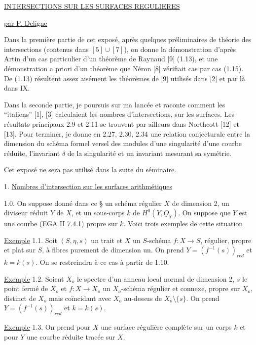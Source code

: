 


\underline{INTERSECTIONS SUR LES SURFACES REGULIERES}


\underline{par P. Deligne}

Dans la première partie de cet exposé, après quelques préliminaires de théorie des intersections (contenus dans $[5] \cup [7]$), on donne la démonstration d'après Artin d'un cas particulier d'un théorème de Raynaud [9] (1.13), et une démonstration a priori d'un théorème que Néron [8] vérifiait cas par cas (1.15). De (1.13) résultent assez aisément les théorèmes de [9] utilisés dans [2] et par là dans IX.

Dans la seconde partie, je poursuis sur ma lancée et raconte comment les ``italiens'' [1], [3] calculaient les nombres d'intersections, sur les surfaces. Les résultats principaux 2.9 et 2.11 se trouvent par ailleurs dans Northcott [12] et [13]. Pour terminer, je donne en 2.27, 2.30, 2.34 une relation conjecturale entre la dimension du schéma formel versel des modules d'une singularité d'une courbe réduite, l'invariant $\delta$ de la singularité et un invariant mesurant sa symétrie.

Cet exposé ne sera pas utilisé dans la suite du séminaire.


1. \underline{Nombres d'intersection sur les surfaces arithmétiques}

1.0. On suppose donné dans ce \S{} un schéma régulier $X$ de dimension 2, un diviseur réduit $Y$ de $X$, et un sous-corps $k$ de $H^0(Y,\underline{O}_Y)$. On suppose que $Y$ est une courbe (EGA II 7.4.1) propre sur $k$. Voici trois exemples de cette situation

\underline{Exemple} 1.1. Soit $(S,\eta,s)$ un trait et $X$ un $S$-schéma $f : X \longrightarrow S$, régulier, propre et plat sur $S$, à fibres purement de dimension un. On prend $Y = (f^{-1}(s))_{red}$ et $k = k(s)$. On se restreindra à ce cas à partir de 1.10.



\underline{Exemple} 1.2. Soient $X_o$ le spectre d'un anneau local normal de dimension 2, $s$ le point fermé de $X_o$ et $f : X \longrightarrow X_o$ un $X_o$-schéma régulier et connexe, propre sur $X_o$, distinct de $X_o$ mais coïncidant avec $X_o$ au-dessus de $X_o \setminus \{s\}$. On prend $Y = (f^{-1}(s))_{red}$ et $k = k(s)$.

\underline{Exemple} 1.3. On prend pour $X$ une surface régulière complète sur un corps $k$ et pour $Y$ une courbe réduite tracée sur $X$.

